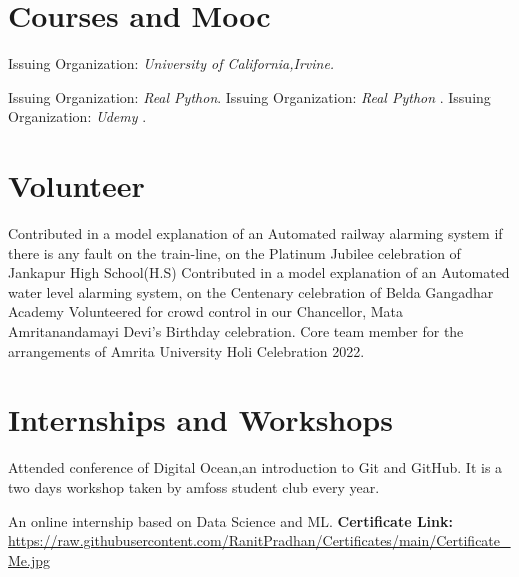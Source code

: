 \documentclass[11pt,a4paper,sans]{moderncv}        %
\begin{document}
\section{Courses and Mooc}
{Issuing Organization: \textit{University of California,Irvine.}
}

{Issuing Organization: \textit{Real Python}.
}
{Issuing Organization: \textit{Real Python} .
}
{Issuing Organization: \textit{Udemy} .
}

\section{Volunteer}
{Contributed in a model explanation of an Automated railway alarming system if there is any fault on the train-line, on the  
Platinum Jubilee celebration of Jankapur High School(H.S)}
{Contributed in a model explanation of an Automated water level alarming system, on the Centenary celebration of Belda Gangadhar Academy}
{Volunteered for crowd control in our Chancellor, Mata Amritanandamayi Devi's Birthday celebration.}
{Core team member for the arrangements of Amrita University Holi Celebration 2022.}

\section{Internships and Workshops}
{Attended conference of Digital Ocean,an introduction to Git and GitHub. It is a two days workshop taken by amfoss student club every year.}

{An online internship based on Data Science and ML. {\newline}
\textbf {Certificate Link:} {\newline}
\url{https://raw.githubusercontent.com/RanitPradhan/Certificates/main/Certificate_Me.jpg }}{}
\end{document}
